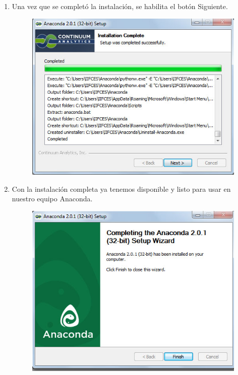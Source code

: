 \documentclass[12pt]{article}
\begin{document}
\begin{enumerate}
\begin{figure}[H]
\end{figure}
\item Una vez que se completó la instalación, se habilita el botón Siguiente.
\begin{figure}[H]
	\centering
	\includegraphics[scale=0.5]{Imagenes/Instalacion_Anaconda_07.jpg} 
\end{figure}
\item Con la instalación completa ya tenemos disponible y listo para usar en nuestro equipo Anaconda.
\begin{figure}[H]
	\centering
	\includegraphics[scale=0.5]{Imagenes/Instalacion_Anaconda_08.jpg} 
\end{figure}

\end{enumerate}
\end{document}

